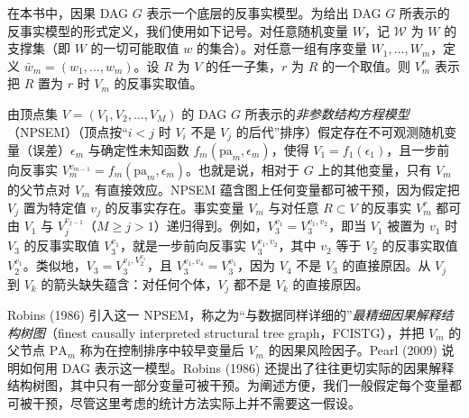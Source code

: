 \begin{techpoint}
在本书中，因果 DAG $G$ 表示一个底层的反事实模型。为给出 DAG $G$ 所表示的反事实模型的形式定义，我们使用如下记号。对任意随机变量 $W$，记 $\mathcal{W}$ 为 $W$ 的支撑集（即 $W$ 的一切可能取值 $w$ 的集合）。对任意一组有序变量 $W_1,\ldots,W_m$，定义 $\bar{w}_m=(w_1,\ldots,w_m)$。设 $R$ 为 $V$ 的任一子集，$r$ 为 $R$ 的一个取值。则 $V_m^{r}$ 表示把 $R$ 置为 $r$ 时 $V_m$ 的反事实取值。

由顶点集 $V=(V_1,V_2,\ldots,V_M)$ 的 DAG $G$ 所表示的\emph{非参数结构方程模型}（NPSEM）（顶点按“$i<j$ 时 $V_i$ 不是 $V_j$ 的后代”排序）假定存在不可观测随机变量（误差）$\epsilon_m$ 与确定性未知函数 $f_m(\mathrm{pa}_m,\epsilon_m)$，使得 $V_1=f_1(\epsilon_1)$，且一步前向反事实 $V_m^{v_{m-1}}=f_m(\mathrm{pa}_m,\epsilon_m)$。也就是说，相对于 $G$ 上的其他变量，只有 $V_m$ 的父节点对 $V_m$ 有直接效应。NPSEM 蕴含图上任何变量都可被干预，因为假定把 $V_j$ 置为特定值 $v_j$ 的反事实存在。事实变量 $V_m$ 与对任意 $R\subset V$ 的反事实 $V_m^{r}$ 都可由 $V_1$ 与 $V_j^{v_{j-1}}$（$M\geq j>1$）递归得到。例如，$V_3^{v_1}=V_3^{v_1,v_2}$，即当 $V_1$ 被置为 $v_1$ 时 $V_3$ 的反事实取值 $V_3^{v_1}$，就是一步前向反事实 $V_3^{v_1,v_2}$，其中 $v_2$ 等于 $V_2$ 的反事实取值 $V_2^{v_1}$。类似地，$V_3=V_3^{v_1,V_2^{v_1}}$，且 $V_3^{v_1,v_4}=V_3^{v_1}$，因为 $V_4$ 不是 $V_3$ 的直接原因。从 $V_j$ 到 $V_k$ 的箭头缺失蕴含：对任何个体，$V_j$ 都不是 $V_k$ 的直接原因。

Robins (1986) 引入这一 NPSEM，称之为“与数据同样详细的”\emph{最精细因果解释结构树图}（finest causally interpreted structural tree graph，FCISTG），并把 $V_m$ 的父节点 $\mathrm{PA}_m$ 称为在控制排序中较早变量后 $V_m$ 的因果风险因子。Pearl (2009) 说明如何用 DAG 表示这一模型。Robins (1986) 还提出了往往更切实际的因果解释结构树图，其中只有一部分变量可被干预。为阐述方便，我们一般假定每个变量都可被干预，尽管这里考虑的统计方法实际上并不需要这一假设。
\end{techpoint}

